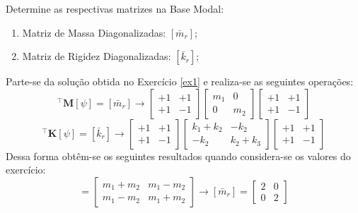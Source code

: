\documentclass{article}
\begin{document}
\newpage\begin{exercise}\label{ex2}
    Determine as respectivas matrizes na Base Modal:
    \begin{enumerate}[noitemsep]
        \item Matriz de Massa Diagonalizadas: $[\bar{m}_r]$;
        \item Matriz de Rigidez Diagonalizadas: $[\bar{k}_r]$;
    \end{enumerate}
\end{exercise}
\begin{resolution}
    Parte-se da solução obtida no Exercício \ref{ex1} e realiza-se as seguintes operações:
    \begin{equation*}
        [\psi]^\intercal \mathbf{M} [\psi] = [\bar{m}_r] \to 
        \begin{bmatrix} +1 & +1\\ +1 & -1\end{bmatrix} 
        \begin{bmatrix} m_1 & 0\\ 0 & m_2\end{bmatrix} 
        \begin{bmatrix} +1 & +1\\ +1 & -1\end{bmatrix}
    \end{equation*}
    \begin{equation*}
        [\psi]^\intercal \mathbf{K} [\psi] = [\bar{k}_r] \to 
        \begin{bmatrix} +1 & +1\\ +1 & -1\end{bmatrix} 
        \begin{bmatrix} k_1 + k_2 & -k_2\\ -k_2 & k_2 + k_3\end{bmatrix} 
        \begin{bmatrix} +1 & +1\\ +1 & -1\end{bmatrix}
    \end{equation*}
    Dessa forma obtêm-se os seguintes resultados quando considera-se os valores do exercício:
    \begin{equation*}
        [\bar{m}_r] = 
        \begin{bmatrix} m_1+m_2 & m_1-m_2\\ m_1-m_2 & m_1+m_2\end{bmatrix} \to 
        \boxed{[\bar{m}_r] = \begin{bmatrix} 2 & 0\\ 0 & 2\end{bmatrix}}

\end{equation*}
\end{resolution}
\end{document}
